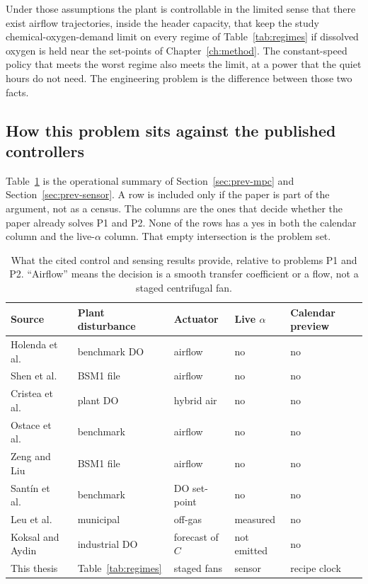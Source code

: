Under those assumptions the plant is controllable in the limited sense that there exist airflow trajectories, inside the header capacity, that keep the study chemical-oxygen-demand limit on every regime of Table~\ref{tab:regimes} if dissolved oxygen is held near the set-points of Chapter~\ref{ch:method}. The constant-speed policy that meets the worst regime also meets the limit, at a power that the quiet hours do not need. The engineering problem is the difference between those two facts.

\subsection{How this problem sits against the published controllers}

Table~\ref{tab:litmap} is the operational summary of Section~\ref{sec:prev-mpc} and Section~\ref{sec:prev-sensor}. A row is included only if the paper is part of the argument, not as a census. The columns are the ones that decide whether the paper already solves P1 and P2. None of the rows has a yes in both the calendar column and the live-$\alpha$ column. That empty intersection is the problem set.

\begin{table}[ht]
\centering
\caption{What the cited control and sensing results provide, relative to problems P1 and P2. ``Airflow'' means the decision is a smooth transfer coefficient or a flow, not a staged centrifugal fan.}
\label{tab:litmap}
\small
\begin{tabular}{@{}p{3.3cm}p{2.3cm}p{2.4cm}p{2.2cm}p{2.4cm}@{}}
\toprule
Source & Plant disturbance & Actuator & Live $\alpha$ & Calendar preview \\
\midrule
Holenda et al.\ \cite{holenda2008} & benchmark DO & airflow & no & no \\
Shen et al.\ \cite{shen2008} & BSM1 file & airflow & no & no \\
Cristea et al.\ \cite{cristea2011} & plant DO & hybrid air & no & no \\
Ostace et al.\ \cite{ostace2011} & benchmark & airflow & no & no \\
Zeng and Liu \cite{zeng2015empc} & BSM1 file & airflow & no & no \\
Sant{\'i}n et al.\ \cite{santin2015jpc} & benchmark & DO set-point & no & no \\
Leu et al.\ \cite{leu2009} & municipal & off-gas & measured & no \\
Koksal and Aydin \cite{koksal2024} & industrial DO & forecast of $C$ & not emitted & no \\
This thesis & Table~\ref{tab:regimes} & staged fans & sensor & recipe clock \\
\bottomrule
\end{tabular}
\end{table}

